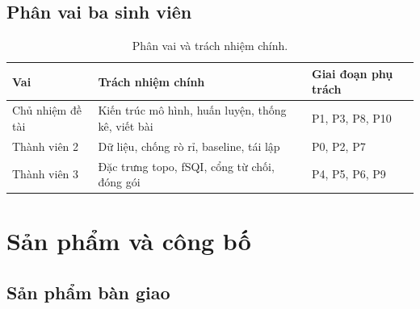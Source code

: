 \subsection{Phân vai ba sinh viên}

\begin{table}[H]\centering\small
\caption{Phân vai và trách nhiệm chính.}
\label{tab:vai}
\begin{tabular}{@{}L{3.2cm} L{5.4cm} L{5.6cm}@{}}
\toprule
\textbf{Vai} & \textbf{Trách nhiệm chính} & \textbf{Giai đoạn phụ trách} \\
\midrule
Chủ nhiệm đề tài & Kiến trúc mô hình, huấn luyện, thống kê, viết bài & P1, P3, P8, P10 \\
Thành viên 2 & Dữ liệu, chống rò rỉ, baseline, tái lập & P0, P2, P7 \\
Thành viên 3 & Đặc trưng topo, fSQI, cổng từ chối, đóng gói & P4, P5, P6, P9 \\
\bottomrule
\end{tabular}
\end{table}

\clearpage

\section{Sản phẩm và công bố}

\subsection{Sản phẩm bàn giao}

